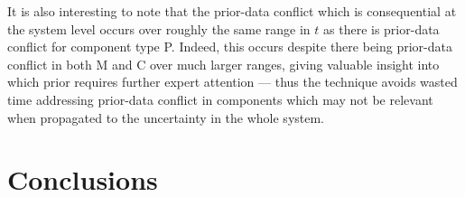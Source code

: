 \documentclass[12pt, a4paper]{elsarticle}
\newcommand{\Rsys}{R_\text{sys}}
\begin{document}
It is also interesting to note that the prior-data conflict 
which is consequential at the system level occurs over 
roughly the same range in $t$ as there is prior-data 
conflict for component type P.
Indeed, this occurs despite there being 
prior-data conflict in both M and C over much larger ranges, 
giving valuable insight into which prior requires further 
expert attention --- thus the technique avoids wasted time 
addressing prior-data conflict in components which may not 
be relevant when propagated to the uncertainty in the whole system.



%


\section{Conclusions}
\end{document}
